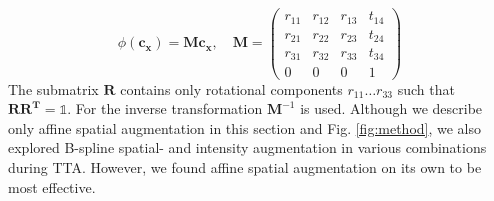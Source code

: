     \begin{equation}
        \phi(\mathbf{c_x}) = \mathbf{Mc_x}, \quad
            \mathbf{M} = \begin{pmatrix}
                r_{11} & r_{12} & r_{13} & t_{14}\\
                r_{21} & r_{22} & r_{23} & t_{24}\\
                r_{31} & r_{32} & r_{33} & t_{34}\\
                0 & 0 & 0 & 1
            \end{pmatrix}
    \end{equation}
    The submatrix $\mathbf{R}$ contains only rotational components
    $r_{11} \dots r_{33}$ such that $\mathbf{R}\mathbf{R^T} = \mathbb{1}$. For the inverse transformation $\mathbf{M}^{-1}$ is used.
    Although we describe only affine spatial augmentation in this section and Fig. \ref{fig:method}, we also explored B-spline spatial- and intensity augmentation in various combinations during TTA. However, we found affine spatial augmentation on its own to be most effective.


